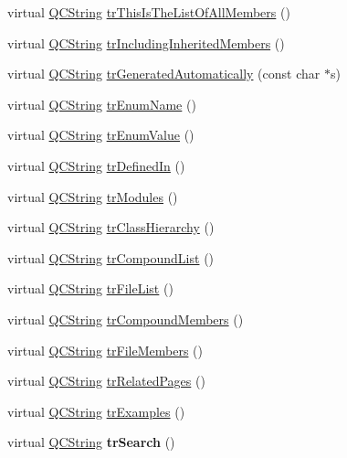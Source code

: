 \begin{DoxyCompactItemize}
\item 
virtual \hyperlink{class_q_c_string}{Q\-C\-String} \hyperlink{class_translator_chinese_a011ff392bb2087e2804dc648db7b3bdd}{tr\-This\-Is\-The\-List\-Of\-All\-Members} ()
\item 
virtual \hyperlink{class_q_c_string}{Q\-C\-String} \hyperlink{class_translator_chinese_ae6babe31ac1979ada5737392536bd239}{tr\-Including\-Inherited\-Members} ()
\item 
virtual \hyperlink{class_q_c_string}{Q\-C\-String} \hyperlink{class_translator_chinese_a25156a73baa8406a915eaa5a6824b359}{tr\-Generated\-Automatically} (const char $\ast$s)
\item 
virtual \hyperlink{class_q_c_string}{Q\-C\-String} \hyperlink{class_translator_chinese_a50df17e22ad96870c7937be7e1ab8dfc}{tr\-Enum\-Name} ()
\item 
virtual \hyperlink{class_q_c_string}{Q\-C\-String} \hyperlink{class_translator_chinese_a5b1d2d5c6825641661ff2cfaeb84307e}{tr\-Enum\-Value} ()
\item 
virtual \hyperlink{class_q_c_string}{Q\-C\-String} \hyperlink{class_translator_chinese_a5ee5473527c64fc3827deca81e253acf}{tr\-Defined\-In} ()
\item 
virtual \hyperlink{class_q_c_string}{Q\-C\-String} \hyperlink{class_translator_chinese_aef7bca894dd93b7fd6803518cede7ef7}{tr\-Modules} ()
\item 
virtual \hyperlink{class_q_c_string}{Q\-C\-String} \hyperlink{class_translator_chinese_a6676bf94846fa80e4a23cf9ea3214b54}{tr\-Class\-Hierarchy} ()
\item 
virtual \hyperlink{class_q_c_string}{Q\-C\-String} \hyperlink{class_translator_chinese_adc612d045d0abf0cfa5085254fca8db5}{tr\-Compound\-List} ()
\item 
virtual \hyperlink{class_q_c_string}{Q\-C\-String} \hyperlink{class_translator_chinese_a1c967abf4f2578ff4185ab2e10f71e14}{tr\-File\-List} ()
\item 
virtual \hyperlink{class_q_c_string}{Q\-C\-String} \hyperlink{class_translator_chinese_a05e152ef7d0c15bb2b34fc12e1a25c56}{tr\-Compound\-Members} ()
\item 
virtual \hyperlink{class_q_c_string}{Q\-C\-String} \hyperlink{class_translator_chinese_ae5ab09d67500e729b9f1b29f4ea57425}{tr\-File\-Members} ()
\item 
virtual \hyperlink{class_q_c_string}{Q\-C\-String} \hyperlink{class_translator_chinese_a8ed40826492d6303375b3031fc88d3b2}{tr\-Related\-Pages} ()
\item 
virtual \hyperlink{class_q_c_string}{Q\-C\-String} \hyperlink{class_translator_chinese_a29f3ce9451daa973dcde36e7d0cab549}{tr\-Examples} ()
\item 
\hypertarget{class_translator_chinese_a6a284cb12ea8d274211aa42dad4654c4}{virtual \hyperlink{class_q_c_string}{Q\-C\-String} {\bfseries tr\-Search} ()}\label{class_translator_chinese_a6a284cb12ea8d274211aa42dad4654c4}


\end{DoxyCompactItemize}
